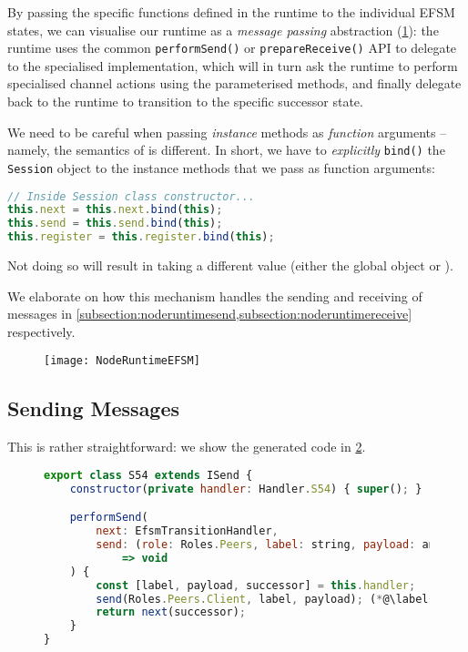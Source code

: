 By passing the specific functions defined in the runtime
to the individual EFSM states, we can visualise our runtime
as a \textit{message passing} abstraction 
(\cref{fig:noderuntimeefsm}): the runtime uses the common
\texttt{performSend()} or \texttt{prepareReceive()} API
to delegate to the specialised implementation, which will in turn
ask the runtime to perform specialised channel actions using
the parameterised methods, and finally delegate back to
the runtime to transition to the specific successor state.

\begin{remark}
We need to be careful when passing \textit{instance} methods
as \textit{function} arguments 
-- namely, the semantics of  is different.
In short, we have to \textit{explicitly}
\texttt{bind()} the \texttt{Session} object
to the instance methods that we pass as function arguments:

\begin{lstlisting}[language=javascript,tabsize=2]
// Inside Session class constructor...
this.next = this.next.bind(this);
this.send = this.send.bind(this);
this.register = this.register.bind(this);
\end{lstlisting}

Not doing so will result in  taking
a different value 
(either the global object or ).
\end{remark}

We elaborate on how this mechanism
handles the sending and receiving of messages in
\cref{subsection:noderuntimesend,subsection:noderuntimereceive}
respectively.

\begin{figure}[!ht]
\centering
\texttt{[image: NodeRuntimeEFSM]}
\label{fig:noderuntimeefsm}
\end{figure}

\subsection{Sending Messages}
\label{subsection:noderuntimesend}

This is rather straightforward: 
we show the generated code in \cref{lst:nodesend}.

\begin{figure}[!h]
\begin{lstlisting}[language=javascript,tabsize=2]
export class S54 extends ISend {
	constructor(private handler: Handler.S54) { super(); }

	performSend(
		next: EfsmTransitionHandler,
		send: (role: Roles.Peers, label: string, payload: any[]) 
			=> void
	) {
		const [label, payload, successor] = this.handler;
		send(Roles.Peers.Client, label, payload); (*@\label{line:nodesendrole}@*)
		return next(successor);
	}
}
\end{lstlisting}
\label{lst:nodesend}
\end{figure}

